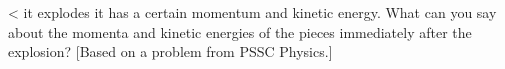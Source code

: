 <%
it explodes it has a certain momentum and kinetic energy.
What can you say about the momenta and kinetic energies of
the pieces immediately after the explosion? [Based on a
problem from PSSC Physics.]
